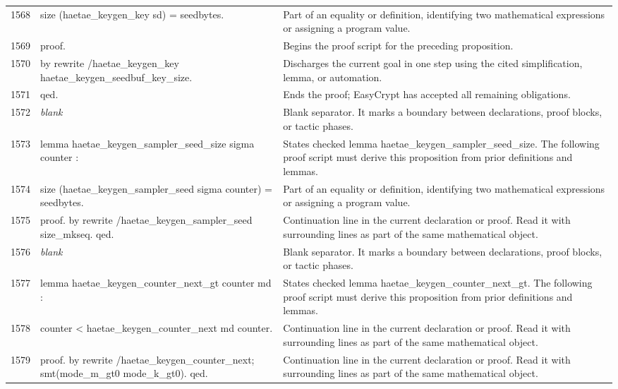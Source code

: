 \documentclass[10pt]{article}
\begin{document}
\begin{longtable}{r L{0.53\textwidth} L{0.37\textwidth}}
1568 & {\ttfamily\scriptsize   size (haetae\_keygen\_key sd) = seedbytes.} & Part of an equality or definition, identifying two mathematical expressions or assigning a program value. \\
1569 & {\ttfamily\scriptsize proof.} & Begins the proof script for the preceding proposition. \\
1570 & {\ttfamily\scriptsize by rewrite /haetae\_keygen\_key haetae\_keygen\_seedbuf\_key\_size.} & Discharges the current goal in one step using the cited simplification, lemma, or automation. \\
1571 & {\ttfamily\scriptsize qed.} & Ends the proof; EasyCrypt has accepted all remaining obligations. \\
1572 & {\ttfamily\scriptsize \emph{blank}} & Blank separator.  It marks a boundary between declarations, proof blocks, or tactic phases. \\
1573 & {\ttfamily\scriptsize lemma haetae\_keygen\_sampler\_seed\_size sigma counter :} & States checked lemma haetae\_keygen\_sampler\_seed\_size.  The following proof script must derive this proposition from prior definitions and lemmas. \\
1574 & {\ttfamily\scriptsize   size (haetae\_keygen\_sampler\_seed sigma counter) = seedbytes.} & Part of an equality or definition, identifying two mathematical expressions or assigning a program value. \\
1575 & {\ttfamily\scriptsize proof. by rewrite /haetae\_keygen\_sampler\_seed size\_mkseq. qed.} & Continuation line in the current declaration or proof.  Read it with surrounding lines as part of the same mathematical object. \\
1576 & {\ttfamily\scriptsize \emph{blank}} & Blank separator.  It marks a boundary between declarations, proof blocks, or tactic phases. \\
1577 & {\ttfamily\scriptsize lemma haetae\_keygen\_counter\_next\_gt counter md :} & States checked lemma haetae\_keygen\_counter\_next\_gt.  The following proof script must derive this proposition from prior definitions and lemmas. \\
1578 & {\ttfamily\scriptsize   counter < haetae\_keygen\_counter\_next md counter.} & Continuation line in the current declaration or proof.  Read it with surrounding lines as part of the same mathematical object. \\
1579 & {\ttfamily\scriptsize proof. by rewrite /haetae\_keygen\_counter\_next; smt(mode\_m\_gt0 mode\_k\_gt0). qed.} & Continuation line in the current declaration or proof.  Read it with surrounding lines as part of the same mathematical object. \\

\end{longtable}
\end{document}
